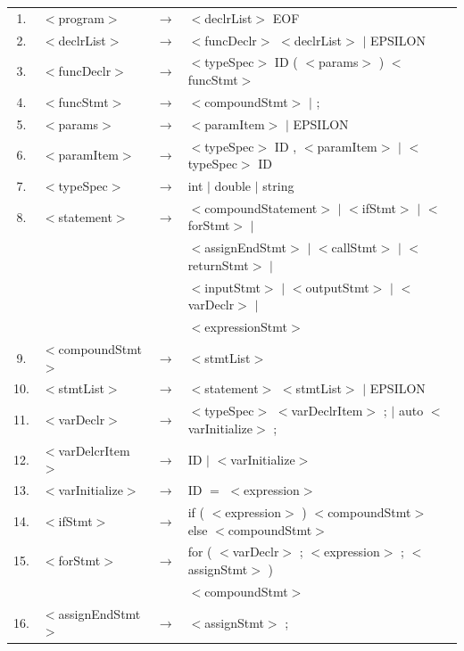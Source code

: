 \documentclass[a4paper, 11pt, titlepage]{article}
\begin{document}
\begin{table}[h]
	\begin{center}
	\begin{tabular}{|c| l c l|}	\hline
	1. 	& $<$program$>$       &$ \rightarrow $& $<$declrList$>$ EOF \\
	2. 	& $<$declrList$>$     &$ \rightarrow $& $<$funcDeclr$>$ $<$declrList$>$ $|$ EPSILON \\
	3. 	& $<$funcDeclr$>$     &$ \rightarrow $& $<$typeSpec$>$ ID ( $<$params$>$ ) $<$funcStmt$>$ \\
	4. 	& $<$funcStmt$>$      &$ \rightarrow $& $<$compoundStmt$>$ $|$ ; \\
	5. 	& $<$params$>$        &$ \rightarrow $& $<$paramItem$>$ $|$ EPSILON \\
	6. 	& $<$paramItem$>$     &$ \rightarrow $& $<$typeSpec$>$ ID , $<$paramItem$>$ $|$ $<$typeSpec$>$ ID \\
	7. 	& $<$typeSpec$>$      &$ \rightarrow $& int $|$ double $|$ string \\
	8. 	& $<$statement$>$     &$ \rightarrow $& $<$compoundStatement$>$ $|$ $<$ifStmt$>$ $|$ $<$forStmt$>$ $|$ \\ 	
		& 					  & 			  & $<$assignEndStmt$>$ $|$ $<$callStmt$>$ $|$ $<$returnStmt$>$ $|$ \\  
		&					  &				  & $<$inputStmt$>$ $|$ $<$outputStmt$>$ $|$ $<$varDeclr$>$ $|$ \\ 
		& 					  & 			  &$<$expressionStmt$>$ \\
	9.  & $<$compoundStmt$>$  &$ \rightarrow $& { $<$stmtList$>$ } \\
	10. & $<$stmtList$>$      &$ \rightarrow $& $<$statement$>$ $<$stmtList$>$ $|$ EPSILON \\
	11. & $<$varDeclr$>$      &$ \rightarrow $& $<$typeSpec$>$ $<$varDeclrItem$>$ ; $|$ auto $<$varInitialize$>$ ; \\
	12. & $<$varDelcrItem$>$  &$ \rightarrow $& ID $|$ $<$varInitialize$>$ \\
	13. & $<$varInitialize$>$ &$ \rightarrow $& ID $=$ $<$expression$>$ \\
	14. & $<$ifStmt$>$        &$ \rightarrow $& if ( $<$expression$>$ ) $<$compoundStmt$>$ else $<$compoundStmt$>$ \\
	15. & $<$forStmt$>$       &$ \rightarrow $& for ( $<$varDeclr$>$ ; $<$expression$>$ ; $<$assignStmt$>$ ) \\ 
		& 					  & 			  & $<$compoundStmt$>$ \\
	16. & $<$assignEndStmt$>$ &$ \rightarrow $& $<$assignStmt$>$ ; \\

\end{tabular}
\end{center}
\end{table}
\end{document}

